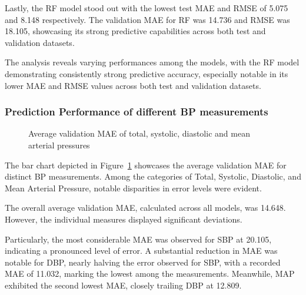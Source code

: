 Lastly, the RF model stood out with the lowest test MAE and RMSE of 5.075 and 8.148 respectively.
The validation MAE for RF was 14.736 and RMSE was 18.105, showcasing its strong predictive capabilities across both test and validation datasets.

The analysis reveals varying performances among the models, with the RF model demonstrating consistently strong predictive accuracy, especially notable in its lower MAE and RMSE values across both test and validation datasets.

\subsubsection{Prediction Performance of different BP measurements}

\begin{figure}[h]
    \centering
    \captionsetup{format=plain, justification=centering, font=small}
    \caption{Average validation MAE of total, systolic, diastolic and mean arterial pressures}
    \label{fig:all_mae}
\end{figure}

The bar chart depicted in Figure~\ref{fig:all_mae} showcases the average validation MAE for distinct BP measurements.
Among the categories of Total, Systolic, Diastolic, and Mean Arterial Pressure, notable disparities in error levels were evident.

The overall average validation MAE, calculated across all models, was 14.648.
However, the individual measures displayed significant deviations.

Particularly, the most considerable MAE was observed for SBP at 20.105, indicating a pronounced level of error.
A substantial reduction in MAE was notable for DBP, nearly halving the error observed for SBP, with a recorded MAE of 11.032, marking the lowest among the measurements.
Meanwhile, MAP exhibited the second lowest MAE, closely trailing DBP at 12.809.

